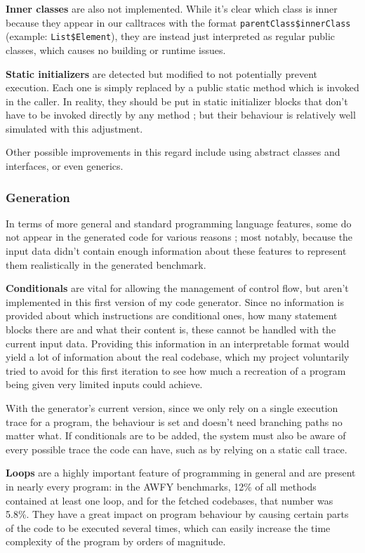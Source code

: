 \documentclass[12pt]{article}
\begin{document}
\bigskip
\textbf{Inner classes} are also not implemented. While it's clear which class is inner because they appear in our calltraces with the format \texttt{parentClass\-\$innerClass} (example: \texttt{List\$Element}), they are instead just interpreted as regular public classes, which causes no building or runtime issues.

\bigskip
\textbf{Static initializers} are detected but modified to not potentially prevent execution. Each one is simply replaced by a public static method which is invoked in the caller. In reality, they should be put in static initializer blocks that don't have to be invoked directly by any method ; but their behaviour is relatively well simulated with this adjustment.

\bigskip
Other possible improvements in this regard include using abstract classes and interfaces, or even generics.

\subsubsection{Generation}
In terms of more general and standard programming language features, some do not appear in the generated code for various reasons ; most notably, because the input data didn't contain enough information about these features to represent them realistically in the generated benchmark.

\bigskip  
\textbf{Conditionals} are vital for allowing the management of control flow, but aren't implemented in this first version of my code generator. Since no information is provided about which instructions are conditional ones, how many statement blocks there are and what their content is, these cannot be handled with the current input data. Providing this information in an interpretable format would yield a lot of information about the real codebase, which my project voluntarily tried to avoid for this first iteration to see how much a recreation of a program being given very limited inputs could achieve.

With the generator's current version, since we only rely on a single execution trace for a program, the behaviour is set and doesn't need branching paths no matter what. If conditionals are to be added, the system must also be aware of every possible trace the code can have, such as by relying on a static call trace.

\bigskip
\textbf{Loops} are a highly important feature of programming in general and are present in nearly every program: in the AWFY benchmarks, 12\% of all methods contained at least one loop, and for the fetched codebases, that number was 5.8\%. They have a great impact on program behaviour by causing certain parts of the code to be executed several times, which can easily increase the time complexity of the program by orders of magnitude.
\end{document}
